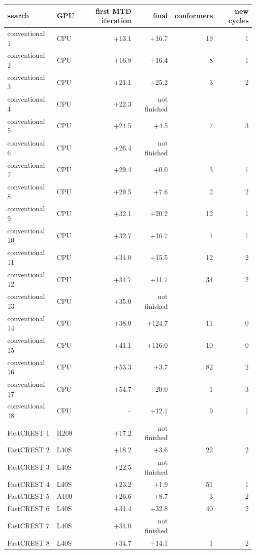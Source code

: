 \begin{tabular}{@{}llrrrr@{}}
\toprule
search & GPU & first MTD iteration & final & conformers & new cycles \\
\midrule
conventional 1 & CPU & $+$13.1 & $+$16.7 & 19 & 1 \\
conventional 2 & CPU & $+$16.8 & $+$16.4 & 8 & 1 \\
conventional 3 & CPU & $+$21.1 & $+$25.2 & 3 & 2 \\
conventional 4 & CPU & $+$22.3 & not finished &  &  \\
conventional 5 & CPU & $+$24.5 & $+$4.5 & 7 & 3 \\
conventional 6 & CPU & $+$26.4 & not finished &  &  \\
conventional 7 & CPU & $+$29.4 & $+$0.0 & 3 & 1 \\
conventional 8 & CPU & $+$29.5 & $+$7.6 & 2 & 2 \\
conventional 9 & CPU & $+$32.1 & $+$20.2 & 12 & 1 \\
conventional 10 & CPU & $+$32.7 & $+$16.7 & 1 & 1 \\
conventional 11 & CPU & $+$34.0 & $+$15.5 & 12 & 2 \\
conventional 12 & CPU & $+$34.7 & $+$11.7 & 34 & 2 \\
conventional 13 & CPU & $+$35.0 & not finished &  &  \\
conventional 14 & CPU & $+$38.0 & $+$124.7 & 11 & 0 \\
conventional 15 & CPU & $+$41.1 & $+$116.0 & 10 & 0 \\
conventional 16 & CPU & $+$53.3 & $+$3.7 & 82 & 2 \\
conventional 17 & CPU & $+$54.7 & $+$20.0 & 1 & 3 \\
conventional 18 & CPU & -- & $+$12.1 & 9 & 1 \\
FastCREST 1 & H200 & $+$17.2 & not finished &  &  \\
FastCREST 2 & L40S & $+$18.2 & $+$3.6 & 22 & 2 \\
FastCREST 3 & L40S & $+$22.5 & not finished &  &  \\
FastCREST 4 & L40S & $+$23.2 & $+$1.9 & 51 & 1 \\
FastCREST 5 & A100 & $+$26.6 & $+$8.7 & 3 & 2 \\
FastCREST 6 & L40S & $+$31.4 & $+$32.8 & 40 & 2 \\
FastCREST 7 & L40S & $+$34.0 & not finished &  &  \\
FastCREST 8 & L40S & $+$34.7 & $+$14.1 & 1 & 2 \\

\end{tabular}

